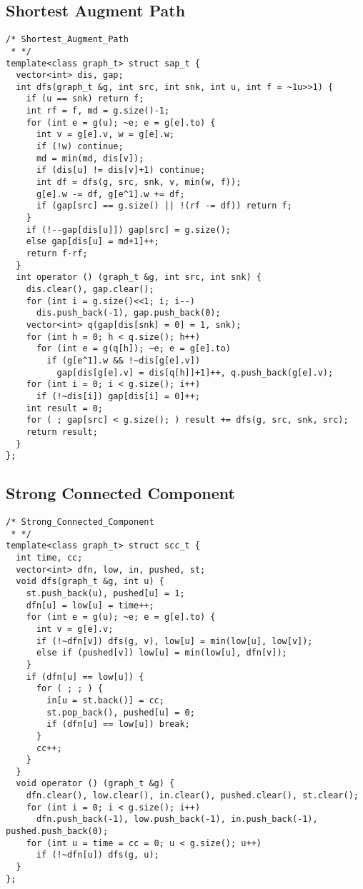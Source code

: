 \subsection{Shortest Augment Path}
\begin{lstlisting}
/* Shortest_Augment_Path
 * */
template<class graph_t> struct sap_t {
  vector<int> dis, gap;
  int dfs(graph_t &g, int src, int snk, int u, int f = ~1u>>1) {
    if (u == snk) return f;
    int rf = f, md = g.size()-1;
    for (int e = g(u); ~e; e = g[e].to) {
      int v = g[e].v, w = g[e].w;
      if (!w) continue;
      md = min(md, dis[v]);
      if (dis[u] != dis[v]+1) continue;
      int df = dfs(g, src, snk, v, min(w, f));
      g[e].w -= df, g[e^1].w += df;
      if (gap[src] == g.size() || !(rf -= df)) return f;
    }
    if (!--gap[dis[u]]) gap[src] = g.size();
    else gap[dis[u] = md+1]++;
    return f-rf;
  }
  int operator () (graph_t &g, int src, int snk) {
    dis.clear(), gap.clear();
    for (int i = g.size()<<1; i; i--)
      dis.push_back(-1), gap.push_back(0);
    vector<int> q(gap[dis[snk] = 0] = 1, snk);
    for (int h = 0; h < q.size(); h++)
      for (int e = g(q[h]); ~e; e = g[e].to)
        if (g[e^1].w && !~dis[g[e].v])
          gap[dis[g[e].v] = dis[q[h]]+1]++, q.push_back(g[e].v);
    for (int i = 0; i < g.size(); i++)
      if (!~dis[i]) gap[dis[i] = 0]++;
    int result = 0;
    for ( ; gap[src] < g.size(); ) result += dfs(g, src, snk, src);
    return result;
  }
};
\end{lstlisting}


\subsection{Strong Connected Component}
\begin{lstlisting}
/* Strong_Connected_Component
 * */
template<class graph_t> struct scc_t {
  int time, cc;
  vector<int> dfn, low, in, pushed, st;
  void dfs(graph_t &g, int u) {
    st.push_back(u), pushed[u] = 1;
    dfn[u] = low[u] = time++;
    for (int e = g(u); ~e; e = g[e].to) {
      int v = g[e].v;
      if (!~dfn[v]) dfs(g, v), low[u] = min(low[u], low[v]);
      else if (pushed[v]) low[u] = min(low[u], dfn[v]);
    }
    if (dfn[u] == low[u]) {
      for ( ; ; ) {
        in[u = st.back()] = cc;
        st.pop_back(), pushed[u] = 0;
        if (dfn[u] == low[u]) break;
      }
      cc++;
    }
  }
  void operator () (graph_t &g) {
    dfn.clear(), low.clear(), in.clear(), pushed.clear(), st.clear();
    for (int i = 0; i < g.size(); i++)
      dfn.push_back(-1), low.push_back(-1), in.push_back(-1), pushed.push_back(0);
    for (int u = time = cc = 0; u < g.size(); u++)
      if (!~dfn[u]) dfs(g, u);
  }
};
\end{lstlisting}


